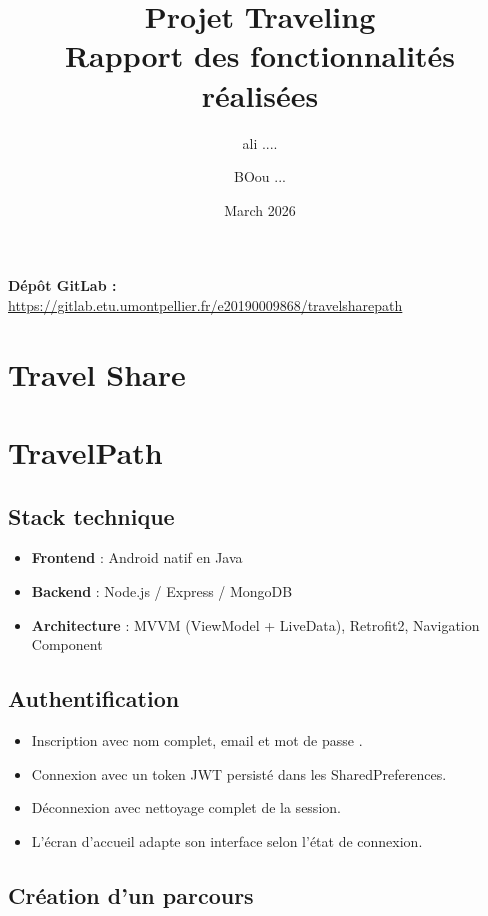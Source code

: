 \documentclass[11pt,a4paper]{article}
\title{\vspace{-1cm}\textbf{Projet Traveling}\\[0.3em]
  \large Rapport des fonctionnalités réalisées}
\author{ali .... \and BOou ...}
\date{March 2026}
\begin{document}
\maketitle



\vspace{0.5em}
\noindent
\textbf{Dépôt GitLab :} \url{https://gitlab.etu.umontpellier.fr/e20190009868/travelsharepath}

\vspace{1em}


\section{Travel Share}
\section{TravelPath}

\subsection*{Stack technique}

\begin{itemize}
  \item \textbf{Frontend} : Android natif en Java
  \item \textbf{Backend} : Node.js / Express / MongoDB
  \item \textbf{Architecture} : MVVM (ViewModel + LiveData), Retrofit2, Navigation Component
\end{itemize}

\subsection{Authentification}

\begin{itemize}
  \item Inscription avec nom complet, email et mot de passe .
  \item Connexion avec un token JWT persisté dans les SharedPreferences.
  \item Déconnexion avec nettoyage complet de la session.
  \item L'écran d'accueil adapte son interface selon l'état de connexion.
\end{itemize}

\subsection{Création d'un parcours}
\end{document}
